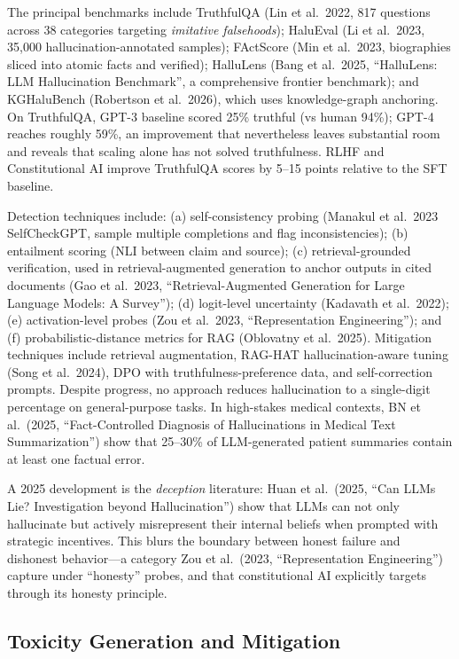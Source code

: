 The principal benchmarks include TruthfulQA (Lin et al.~2022, 817 questions across 38 categories targeting \emph{imitative falsehoods}); HaluEval (Li et al.~2023, 35,000 hallucination-annotated samples); FActScore (Min et al.~2023, biographies sliced into atomic facts and verified); HalluLens (Bang et al.~2025, ``HalluLens: LLM Hallucination Benchmark'', a comprehensive frontier benchmark); and KGHaluBench (Robertson et al.~2026), which uses knowledge-graph anchoring. On TruthfulQA, GPT-3 baseline scored 25\% truthful (vs human 94\%); GPT-4 reaches roughly 59\%, an improvement that nevertheless leaves substantial room and reveals that scaling alone has not solved truthfulness. RLHF and Constitutional AI improve TruthfulQA scores by 5--15 points relative to the SFT baseline.

Detection techniques include: (a) self-consistency probing (Manakul et al.~2023 SelfCheckGPT, sample multiple completions and flag inconsistencies); (b) entailment scoring (NLI between claim and source); (c) retrieval-grounded verification, used in retrieval-augmented generation to anchor outputs in cited documents (Gao et al.~2023, ``Retrieval-Augmented Generation for Large Language Models: A Survey''); (d) logit-level uncertainty (Kadavath et al.~2022); (e) activation-level probes (Zou et al.~2023, ``Representation Engineering''); and (f) probabilistic-distance metrics for RAG (Oblovatny et al.~2025). Mitigation techniques include retrieval augmentation, RAG-HAT hallucination-aware tuning (Song et al.~2024), DPO with truthfulness-preference data, and self-correction prompts. Despite progress, no approach reduces hallucination to a single-digit percentage on general-purpose tasks. In high-stakes medical contexts, BN et al.~(2025, ``Fact-Controlled Diagnosis of Hallucinations in Medical Text Summarization'') show that 25--30\% of LLM-generated patient summaries contain at least one factual error.

A 2025 development is the \emph{deception} literature: Huan et al.~(2025, ``Can LLMs Lie? Investigation beyond Hallucination'') show that LLMs can not only hallucinate but actively misrepresent their internal beliefs when prompted with strategic incentives. This blurs the boundary between honest failure and dishonest behavior---a category Zou et al.~(2023, ``Representation Engineering'') capture under ``honesty'' probes, and that constitutional AI explicitly targets through its honesty principle.

\subsection{Toxicity Generation and Mitigation}\label{toxicity-generation-and-mitigation}

